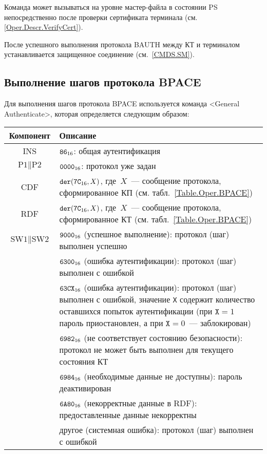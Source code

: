 Команда может вызываться на уровне мастер-файла в состоянии PS 
непосредственно после проверки сертификата терминала
(см. \ref{Oper.Descr.VerifyCert}).

После успешного выполнения протокола BAUTH между КТ и терминалом 
устанавливается защищенное соединение (см.~\ref{CMDS.SM}).

\subsection{Выполнение шагов протокола BPACE}
\label{Oper.Descr.GABPACE} 

Для выполнения шагов протокола BPACE 
используется команда <General Authenticate>,
которая определяется следующим образом: 


\noindent
\begin{tabular}{|c|p{14cm}|}
\hline
Компонент & 	Описание \\
\hline
\hline
INS & $\texttt{86}_{16}$: общая аутентификация \\
\hline
$\text{P1} \parallel \text{P2}$ & $\texttt{0000}_{16}$: протокол уже задан\\ 
\hline
CDF & $\texttt{der}(\texttt{7C}_{16}, X)$, 
где~$X$~--- сообщение протокола, сформированное КП (см. табл.~\ref{Table.Oper.BPACE})\\
\hline \hline
RDF & $\texttt{der}(\texttt{7C}_{16}, X)$, где~$X$~--- 
сообщение протокола, сформированное КТ (см. табл.~\ref{Table.Oper.BPACE})\\
\hline
$\text{SW1} \parallel \text{SW2}$ & $\texttt{9000}_{16}$ 
(успешное выполнение): протокол (шаг) выполнен успешно\\
 & $\texttt{6300}_{16}$ (ошибка аутентификации): протокол (шаг) выполнен с ошибкой \\
 & $\texttt{63CX}_{16}$ (ошибка аутентификации): протокол (шаг) выполнен с ошибкой, 
значение \texttt{X} содержит количество оставшихся попыток аутентификации 
(при $\texttt{X} = 1$ пароль приостановлен, а при $\texttt{X} = 0$~--- 
заблокирован)\\ 
 & $\texttt{6982}_{16}$ (не соответствует состоянию безопасности): протокол не может 
быть выполнен для текущего состояния КТ\\
 & $\texttt{6984}_{16}$ (необходимые данные не доступны): пароль деактивирован \\
 & $\texttt{6A80}_{16}$ (некорректные данные в RDF): предоставленные данные некорректны\\
 & другое (системная ошибка): протокол (шаг) выполнен с ошибкой \\
\hline
\end{tabular}

